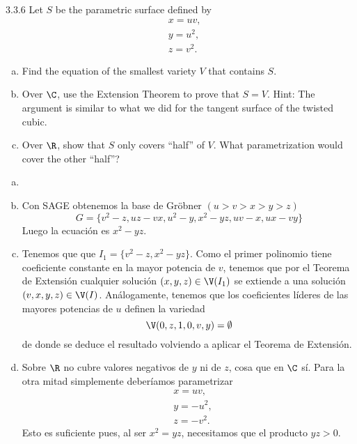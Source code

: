 \documentclass[twoside]{article}
\begin{document}
\begin{ejercicio}{3.3.6}
Let $S$ be the parametric surface defined by
\begin{align*}
&x = uv,\\
&y = u^2,\\
&z = v^2.
\end{align*}
\begin{enumerate}[a.]
\item Find the equation of the smallest variety $V$ that contains $S$.
\item Over $\C$, use the Extension Theorem to prove that $S = V$. Hint: The argument is
similar to what we did for the tangent surface of the twisted cubic.
\item Over $\R$, show that $S$ only covers “half” of $V$. What parametrization would cover the
other “half”?
\end{enumerate}
\end{ejercicio}
\begin{solucion}
\begin{enumerate}[a.]
\item[]
\item Con SAGE obtenemos la base de Gröbner $(u>v>x>y>z)$
$$
G=\{v^2 - z, uz - vx, u^2 - y, x^2 - yz, uv - x, ux - vy\}
$$
Luego la ecuación es $x^2-yz$.
\item Tenemos que que $I_1 = \{v^2-z,x^2-yz\}$. Como el primer polinomio tiene coeficiente constante en la mayor potencia de $v$, tenemos que por el Teorema de Extensión cualquier solución $(x,y,z)\in \V(I_1)$ se extiende a una solución $(v,x,y,z)\in \V(I)$. Análogamente, tenemos que los coeficientes líderes de las mayores potencias de $u$ definen la variedad
$$
\V(0,z,1,0,v,y) = \emptyset
$$
de donde se deduce el resultado volviendo a aplicar el Teorema de Extensión.
\item Sobre $\R$ no cubre valores negativos de $y$ ni de $z$, cosa que en $\C$ sí. Para la otra mitad simplemente deberíamos parametrizar
\begin{align*}
&x = uv,\\
&y = -u^2,\\
&z = -v^2.
\end{align*}
Esto es suficiente pues, al ser $x^2=yz$, necesitamos que el producto $yz>0$. 
\end{enumerate}
\end{solucion}
\newpage
\end{document}
